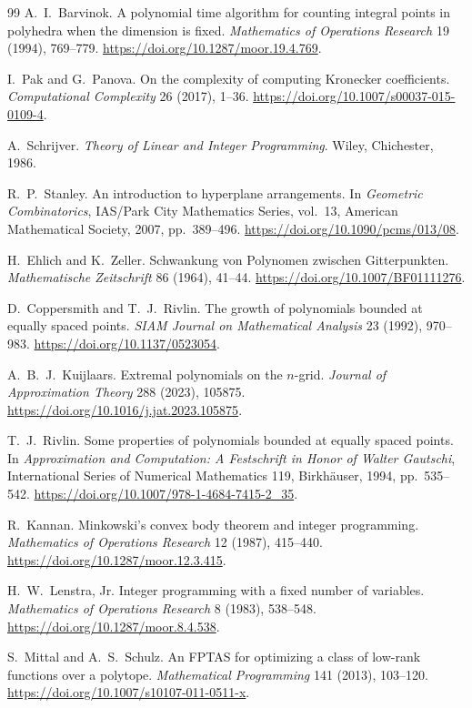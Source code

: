 \documentclass[11pt]{article}
\theoremstyle{definition}\newtheorem{definition}{Definition}[section]
\theoremstyle{remark}\newtheorem{remark}[theorem]{Remark}
\begin{document}
\begin{thebibliography}{99}
 A.~I.~Barvinok.
A polynomial time algorithm for counting integral points in polyhedra when the dimension is fixed.
\emph{Mathematics of Operations Research} 19 (1994), 769--779.
\url{https://doi.org/10.1287/moor.19.4.769}.

 I.~Pak and G.~Panova.
On the complexity of computing Kronecker coefficients.
\emph{Computational Complexity} 26 (2017), 1--36.
\url{https://doi.org/10.1007/s00037-015-0109-4}.

 A.~Schrijver.
\emph{Theory of Linear and Integer Programming}. Wiley, Chichester, 1986.

 R.~P.~Stanley.
An introduction to hyperplane arrangements.
In \emph{Geometric Combinatorics}, IAS/Park City Mathematics Series, vol.~13,
American Mathematical Society, 2007, pp.~389--496.
\url{https://doi.org/10.1090/pcms/013/08}.

 H.~Ehlich and K.~Zeller.
Schwankung von Polynomen zwischen Gitterpunkten.
\emph{Mathematische Zeitschrift} 86 (1964), 41--44.
\url{https://doi.org/10.1007/BF01111276}.

 D.~Coppersmith and T.~J.~Rivlin.
The growth of polynomials bounded at equally spaced points.
\emph{SIAM Journal on Mathematical Analysis} 23 (1992), 970--983.
\url{https://doi.org/10.1137/0523054}.

 A.~B.~J.~Kuijlaars.
Extremal polynomials on the $n$-grid.
\emph{Journal of Approximation Theory} 288 (2023), 105875.
\url{https://doi.org/10.1016/j.jat.2023.105875}.

 T.~J.~Rivlin.
Some properties of polynomials bounded at equally spaced points.
In \emph{Approximation and Computation: A Festschrift in Honor of Walter Gautschi},
International Series of Numerical Mathematics 119, Birkh\"auser, 1994, pp.~535--542.
\url{https://doi.org/10.1007/978-1-4684-7415-2_35}.

 R.~Kannan.
Minkowski's convex body theorem and integer programming.
\emph{Mathematics of Operations Research} 12 (1987), 415--440.
\url{https://doi.org/10.1287/moor.12.3.415}.

 H.~W.~Lenstra, Jr.
Integer programming with a fixed number of variables.
\emph{Mathematics of Operations Research} 8 (1983), 538--548.
\url{https://doi.org/10.1287/moor.8.4.538}.

 S.~Mittal and A.~S.~Schulz.
An FPTAS for optimizing a class of low-rank functions over a polytope.
\emph{Mathematical Programming} 141 (2013), 103--120.
\url{https://doi.org/10.1007/s10107-011-0511-x}.


\end{thebibliography}
\end{document}
